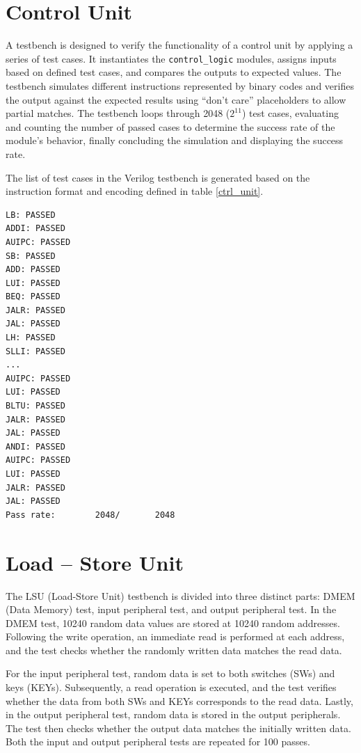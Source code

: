 \documentclass[12pt,a4paper,oneside]{book} %
\begin{document}
\section{Control Unit}
A testbench is designed to verify the functionality of a control unit by applying a series of test cases. It instantiates the \texttt{control\_logic} modules, assigns inputs based on defined test cases, and compares the outputs to expected values. The testbench simulates different instructions represented by binary codes and verifies the output against the expected results using ``don't care'' placeholders to allow partial matches. The testbench loops through 2048 ($2^{11}$) test cases, evaluating and counting the number of passed cases to determine the success rate of the module's behavior, finally concluding the simulation and displaying the success rate.

The list of test cases in the Verilog testbench is generated based on the instruction format and encoding defined in table \ref{ctrl_unit}.

\begin{verbatim}
LB: PASSED
ADDI: PASSED
AUIPC: PASSED
SB: PASSED
ADD: PASSED
LUI: PASSED
BEQ: PASSED
JALR: PASSED
JAL: PASSED
LH: PASSED
SLLI: PASSED
...
AUIPC: PASSED
LUI: PASSED
BLTU: PASSED
JALR: PASSED
JAL: PASSED
ANDI: PASSED
AUIPC: PASSED
LUI: PASSED
JALR: PASSED
JAL: PASSED
Pass rate:        2048/       2048
\end{verbatim}


\section{Load -- Store Unit}
The LSU (Load-Store Unit) testbench is divided into three distinct parts: DMEM (Data Memory) test, input peripheral test, and output peripheral test. In the DMEM test, 10240 random data values are stored at 10240 random addresses. Following the write operation, an immediate read is performed at each address, and the test checks whether the randomly written data matches the read data.

For the input peripheral test, random data is set to both switches (SWs) and keys (KEYs). Subsequently, a read operation is executed, and the test verifies whether the data from both SWs and KEYs corresponds to the read data. Lastly, in the output peripheral test, random data is stored in the output peripherals. The test then checks whether the output data matches the initially written data. Both the input and output peripheral tests are repeated for 100 passes.
\end{document}
